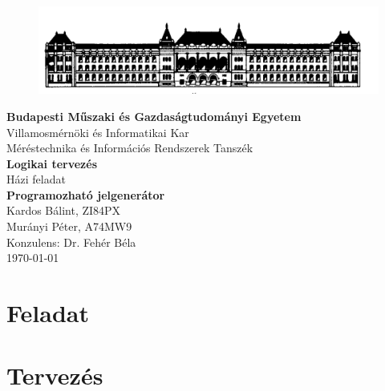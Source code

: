 \documentclass[a4paper,11pt]{article}
\begin{document}
\sloppy

\begin{titlepage}
\begin{center}
\begin{figure}[t!]
	\begin{center}
	\includegraphics[scale=0.2]{bme.png}
	\label{a:bme}
	\end{center}
\end{figure}
\textbf{{Budapesti Műszaki és Gazdaságtudományi Egyetem}}\\
Villamosmérnöki és Informatikai Kar\\
Méréstechnika és Információs Rendszerek Tanszék\\
\vfill
\huge\textbf{{Logikai tervezés}}\\[3mm]
\Large{Házi feladat}\\[3mm]
\Large\textbf{{Programozható jelgenerátor}}\\
\vfill
\Large{Kardos Bálint, ZI84PX}\\
\Large{Murányi Péter, A74MW9}\\
\Large{Konzulens: Dr. Fehér Béla}\\
\vfill
\today \\

\end{center}
\end{titlepage}

\tableofcontents
\thispagestyle{empty}
\clearpage

\setcounter{page}{1}
\setcounter{tocdepth}{4}
\setcounter{secnumdepth}{4}
\setlength{\parindent}{0em}
\setlength{\parskip}{1em}
\section{Feladat}


\section{Tervezés}

\end{document}
